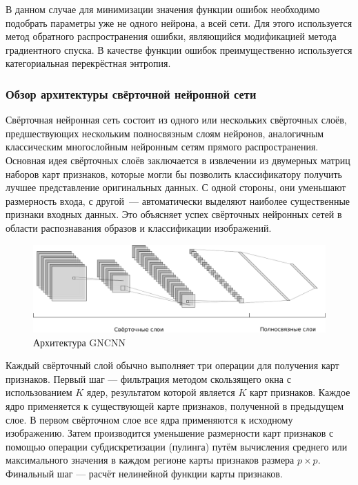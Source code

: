В данном случае для минимизации значения функции ошибок необходимо подобрать параметры уже не одного нейрона, а всей сети. Для этого используется метод обратного распространения ошибки, являющийся модификацией метода градиентного спуска. В качестве функции ошибок преимущественно используется категориальная перекрёстная энтропия.

\subsubsection{Обзор архитектуры свёрточной нейронной сети}

Свёрточная нейронная сеть состоит из одного или нескольких свёрточных слоёв, предшествующих нескольким полносвязным слоям нейронов, аналогичным классическим многослойным нейронным сетям прямого распространения. Основная идея свёрточных слоёв заключается в извлечении из двумерных матриц наборов карт признаков, которые могли бы позволить классификатору получить лучшее представление оригинальных данных. С одной стороны, они уменьшают размерность входа, с другой~--- автоматически выделяют наиболее существенные признаки входных данных. Это объясняет успех свёрточных нейронных сетей в области распознавания образов и классификации изображений.


\begin{figure}
\centering
\includegraphics[width=1\textwidth]{include/graphics/cnn_architecture_example}
\caption{Архитектура GNCNN}
\label{fig:GNCNNArchitecture}
\end{figure}


Каждый свёрточный слой обычно выполняет три операции для получения карт признаков. Первый шаг --- фильтрация методом скользящего окна с использованием $ K $ ядер, результатом которой является $ K $ карт признаков. Каждое ядро применяется к существующей карте признаков, полученной в предыдущем слое. В первом свёрточном слое все ядра применяются к исходному изображению. Затем производится уменьшение размерности карт признаков с помощью операции субдискретизации (пулинга) путём вычисления среднего или максимального значения в каждом регионе карты признаков размера $ p \times p $. Финальный шаг --- расчёт нелинейной функции карты признаков.

